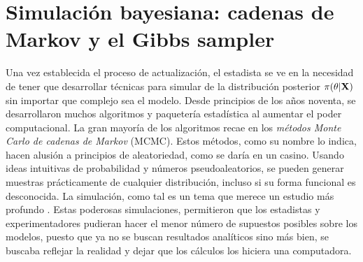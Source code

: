 \documentclass[../Main/Main.tex]{subfiles}
\begin{document}
\section{Simulación bayesiana: cadenas de Markov y el Gibbs sampler} \label{sec:GibbsSampler}
Una vez establecida el proceso de actualización, el estadista se ve en la necesidad de tener que desarrollar técnicas para simular de la distribución posterior $\pi(\theta|\mathbf{X})$ sin importar que complejo sea el modelo. Desde principios de los años noventa, se desarrollaron muchos algoritmos y paquetería estadística al aumentar el poder computacional.  La gran mayoría de los algoritmos recae en los \textit{métodos Monte Carlo de cadenas de Markov} (MCMC). Estos métodos, como su nombre lo indica, hacen alusión a principios de aleatoriedad, como se daría en un casino. Usando ideas intuitivas de probabilidad y números pseudoaleatorios, se pueden generar muestras prácticamente de cualquier distribución, incluso si su forma funcional es desconocida. La simulación, como tal es un tema que merece un estudio más profundo \autocite{robert2004monte}. Estas poderosas simulaciones, permitieron  que los estadistas y experimentadores pudieran hacer el menor número de supuestos posibles sobre los modelos, puesto que ya no se buscan resultados analíticos sino más bien, se buscaba reflejar la realidad y dejar que los cálculos los hiciera una computadora.
\end{document}
